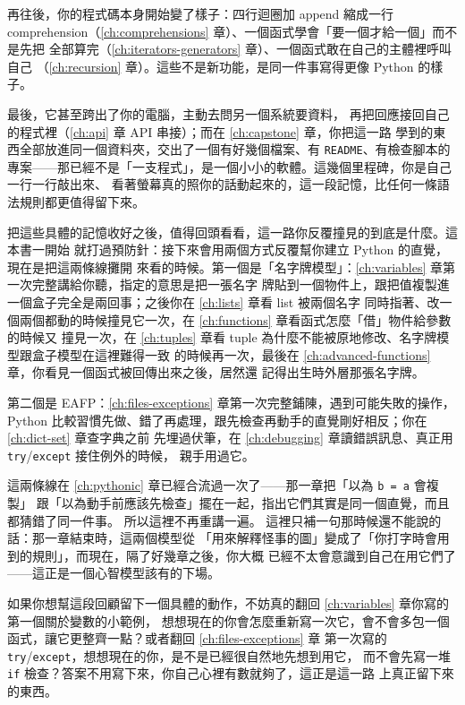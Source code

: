 再往後，你的程式碼本身開始變了樣子：四行迴圈加 append 縮成一行
comprehension（\ref{ch:comprehensions} 章）、一個函式學會「要一個才給一個」而不是先把
全部算完（\ref{ch:iterators-generators} 章）、一個函式敢在自己的主體裡呼叫自己
（\ref{ch:recursion} 章）。這些不是新功能，是同一件事寫得更像 Python 的樣子。

最後，它甚至跨出了你的電腦，主動去問另一個系統要資料，
再把回應接回自己的程式裡（\ref{ch:api} 章 API 串接）；而在 \ref{ch:capstone} 章，你把這一路
學到的東西全部放進同一個資料夾，交出了一個有好幾個檔案、有 \texttt{README}、有檢查腳本的
專案——那已經不是「一支程式」，是一個小小的軟體。這幾個里程碑，你是自己一行一行敲出來、
看著螢幕真的照你的話動起來的，這一段記憶，比任何一條語法規則都更值得留下來。

把這些具體的記憶收好之後，值得回頭看看，這一路你反覆撞見的到底是什麼。這本書一開始
就打過預防針：接下來會用兩個方式反覆幫你建立 Python 的直覺，現在是把這兩條線攤開
來看的時候。第一個是「名字牌模型」：\ref{ch:variables} 章第一次完整講給你聽，指定的意思是把一張名字
牌貼到一個物件上，跟把值複製進一個盒子完全是兩回事；之後你在 \ref{ch:lists} 章看 list 被兩個名字
同時指著、改一個兩個都動的時候撞見它一次，在 \ref{ch:functions} 章看函式怎麼「借」物件給參數的時候又
撞見一次，在 \ref{ch:tuples} 章看 tuple 為什麼不能被原地修改、名字牌模型跟盒子模型在這裡難得一致
的時候再一次，最後在 \ref{ch:advanced-functions} 章，你看見一個函式被回傳出來之後，居然還
記得出生時外層那張名字牌。

第二個是 EAFP：\ref{ch:files-exceptions} 章第一次完整鋪陳，遇到可能失敗的操作，
Python 比較習慣先做、錯了再處理，跟先檢查再動手的直覺剛好相反；你在 \ref{ch:dict-set} 章查字典之前
先埋過伏筆，在 \ref{ch:debugging} 章讀錯誤訊息、真正用 \texttt{try}/\texttt{except} 接住例外的時候，
親手用過它。

這兩條線在 \ref{ch:pythonic} 章已經合流過一次了——那一章把「以為 \texttt{b = a} 會複製」
跟「以為動手前應該先檢查」擺在一起，指出它們其實是同一個直覺，而且都猜錯了同一件事。
所以這裡不再重講一遍。 這裡只補一句那時候還不能說的話：那一章結束時，這兩個模型從
「用來解釋怪事的圖」變成了「你打字時會用到的規則」，而現在，隔了好幾章之後，你大概
已經不太會意識到自己在用它們了——這正是一個心智模型該有的下場。

如果你想幫這段回顧留下一個具體的動作，不妨真的翻回 \ref{ch:variables} 章你寫的第一個關於變數的小範例，
想想現在的你會怎麼重新寫一次它，會不會多包一個函式，讓它更整齊一點？或者翻回 \ref{ch:files-exceptions} 章
第一次寫的 \texttt{try}/\texttt{except}，想想現在的你，是不是已經很自然地先想到用它，
而不會先寫一堆 \texttt{if} 檢查？答案不用寫下來，你自己心裡有數就夠了，這正是這一路
上真正留下來的東西。

